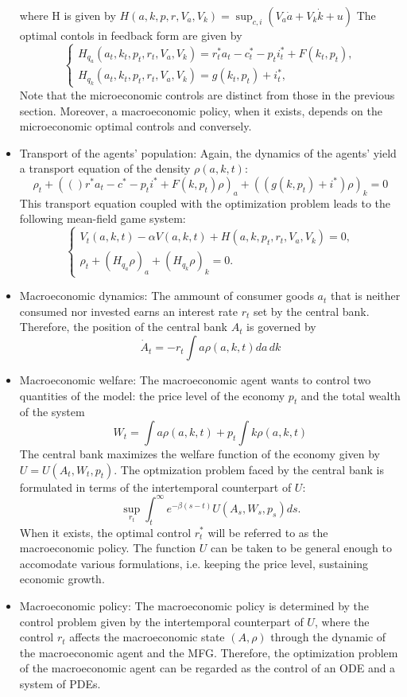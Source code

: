 \documentclass{article}
\begin{document}
\begin{itemize}
$$    $$
    where H is given by $H(a,k,p,r,V_a,V_k) = \sup_{c,i} \left( V_a {\dot a} + V_k {\dot k} + u \right)$
    The optimal contols in feedback form are given by
    $$
    \begin{cases}
        H_{q_a} (a_t, k_t, p_t, r_t, V_a, V_k) = r^*_t a_t - c^*_t - p_t i^*_t + F(k_t,p_t),\\
        H_{q_k} (a_t, k_t, p_t, r_t, V_a, V_k) = g(k_t, p_t) + i^*_t,
    \end{cases}
    $$
    Note that the microeconomic controls are distinct from those in the previous section. Moreover,
    a macroeconomic policy, when it exists, depends on the microeconomic optimal controls and conversely.
    \item Transport of the agents' population:
    Again, the dynamics of the agents' yield a transport equation of the density $\rho(a,k,t)$:
    $$
    \rho_t + (()r^* a_t - c^* - p_t i^* + F(k,p_t)\rho)_a + ( (g(k,p_t) + i^*)\rho )_k = 0
    $$
    This transport equation coupled with the optimization problem leads to the following mean-field game system:
    $$
    \begin{cases}
        V_t(a,k,t) - \alpha V(a,k,t) + H(a,k,p_t,r_t,V_a,V_k) = 0,\\
        \rho_t + (H_{q_a} \rho)_a + (H_{q_k} \rho)_k = 0.
    \end{cases}
    $$
    \item Macroeconomic dynamics: 
    The ammount of consumer goods $a_t$ that is neither consumed nor invested earns an interest rate $r_t$
    set by the central bank. Therefore, the position of the central bank $A_t$ is governed by
    $$
    \dot A_t = -r_t \int a \rho(a,k,t) da\, dk
    $$

    \item Macroeconomic welfare:
    The macroeconomic agent wants to control two quantities of the model: the price level of the economy
    $p_t$ and the total wealth of the system 
    $$
    W_t = \int a \rho(a,k,t) + p_t \int k \rho(a,k,t)
    $$
    The central bank maximizes the welfare function of the economy given by $U = U(A_t, W_t, p_t)$.
    The optmization problem faced by the central bank is formulated in terms of the intertemporal counterpart
    of $U$:
    $$
    \sup_{r_t} \int^\infty_t e^{-\beta (s-t)} U(A_s,W_s,p_s) ds.
    $$
    When it exists, the optimal control $r^*_t$ will be referred to as the macroeconomic policy.
    The function $U$ can be taken to be general enough to accomodate various formulations,
    i.e. keeping the price level, sustaining economic growth.
    \item Macroeconomic policy: 
    The macroeconomic policy is determined by the control problem given by the intertemporal counterpart
    of $U$, where the control $r_t$ affects the macroeconomic state $(A,\rho)$ through the dynamic of 
    the macroeconomic agent and the MFG. Therefore, the optimization problem of the macroeconomic agent can 
    be regarded as the control of an ODE and a system of PDEs.
\end{itemize}
\end{document}
